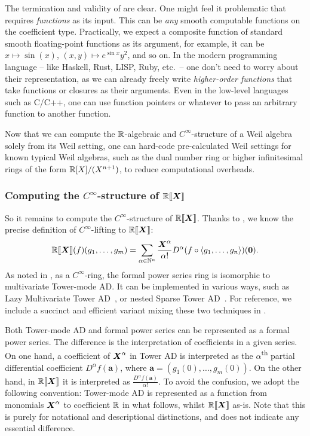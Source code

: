 The termination and validity of  are clear.
One might feel it problematic that  requires \emph{functions} as its input.
This can be \emph{any} smooth computable functions on the coefficient type.
Practically, we expect a composite function of standard smooth floating-point functions as its argument,
for example, it can be $x \mapsto \sin(x)$, $(x, y) \mapsto e^{\sin x}y^2$, and so on.
In the modern programming language -- like Haskell, Rust, LISP, Ruby, etc.\ -- one don't need to worry about their representation, as we can already freely write \emph{higher-order functions} that take functions or closures as their arguments.
Even in the low-level languages such as C/C++, one can use function pointers or whatever to pass an arbitrary function to another function.

Now that we can compute the $\mathbb{R}$-algebraic and $C^\infty$-structure of a Weil algebra solely from its Weil setting, one can hard-code pre-calculated Weil settings for known typical Weil algebras, such as the dual number ring or higher infinitesimal rings of the form $\mathbb{R}[X]/(X^{n+1})$, to reduce computational overheads.

\subsubsection{Computing the $C^\infty$-structure of $\mathord{\mathbb{R}\llbracket\boldsymbol{X}\rrbracket}$}\label{sec:power-series-lifting}
So it remains to compute the $C^\infty$-structure of $\mathord{\mathbb{R}\llbracket\boldsymbol{X}\rrbracket}$.
Thanks to , we know the precise definition of $C^\infty$-lifting to $\mathord{\mathbb{R}\llbracket\boldsymbol{X}\rrbracket}$:
\[
  \mathord{\mathbb{R}\llbracket\boldsymbol{X}\rrbracket}(f)(g_1, \dots, g_m) = \sum_{\alpha \in \mathbb{N}^n} \frac{\boldsymbol{X}^\alpha}{\alpha!} D^\alpha(f \circ \braket{g_1, \dots, g_n})(\boldsymbol{0}).
\]
As noted in , as a $C^\infty$-ring, the formal power series ring is isomorphic to multivariate Tower-mode AD.
It can be implemented in various ways, such as Lazy Multivariate Tower AD~\cite{Pearlmutter:2007aa}, or nested Sparse Tower AD~\cite[{module \texttt{Numeric.AD.Rank1.Sparse}}]{Kmett:2010aa}.
For reference, we include a succinct and efficient variant mixing these two techniques in .

Both Tower-mode AD and formal power series can be represented as a formal power series.
The difference is the interpretation of coefficients in a given series.
On one hand, a coefficient of $\boldsymbol{X}^\alpha$ in Tower AD is interpreted as the $\alpha$\textsuperscript{th} partial differential coefficient $D^\alpha f(\boldsymbol{a})$, where $\boldsymbol{a} = (g_1(0), \dots, g_m(0))$.
On the other hand, in $\mathord{\mathbb{R}\llbracket\boldsymbol{X}\rrbracket}$ it is interpreted as $\frac{D^\alpha f(\boldsymbol{a})}{\alpha!}$.
To avoid the confusion, we adopt the following convention: Tower-mode AD is represented as a function from monomials $\boldsymbol{X}^\alpha$ to coefficient $\mathbb{R}$ in what follows, whilst $\mathord{\mathbb{R}\llbracket\boldsymbol{X}\rrbracket}$ as-is.
Note that this is purely for notational and descriptional distinctions, and does not indicate any essential difference.

